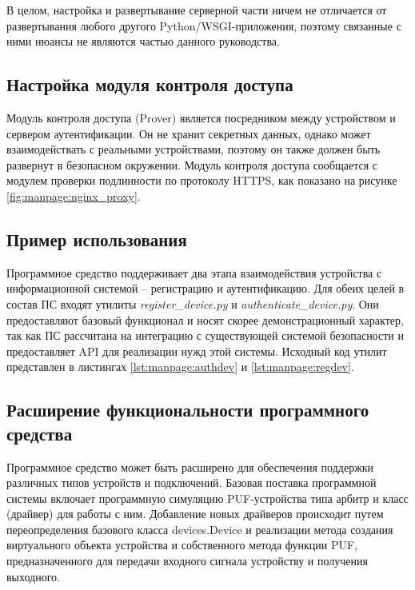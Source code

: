 



В целом, настройка и развертывание серверной части ничем не отличается от развертывания любого другого Python/WSGI-приложения, поэтому связанные с ними нюансы не являются частью данного руководства.

\subsection{Настройка модуля контроля доступа}
\label{sec:manpage:client_setup}
Модуль контроля доступа (Prover) является посредником между устройством и сервером аутентификации. Он не хранит секретных данных, однако может взаимодействать с реальными устройствами, поэтому он также должен быть развернут в безопасном окружении. Модуль контроля доступа сообщается с модулем проверки подлинности по протоколу HTTPS, как показано на рисунке \ref{fig:manpage:nginx_proxy}.


\subsection{Пример использования}
Программное средство поддерживает два этапа взаимодействия устройства с информационной системой -- регистрацию и аутентификацию. Для обеих целей в состав ПС входят утилиты \emph{register\_device.py} и \emph{authenticate\_device.py}. Они предоставляют базовый функционал и носят скорее демонстрационный характер, так как ПС рассчитана на интеграцию с существующей системой безопасности и предоставляет API для реализации нужд этой системы. Исходный код утилит представлен в листингах \ref{lst:manpage:authdev} и \ref{lst:manpage:regdev}.





\subsection{Расширение функциональности программного средства}
Программное средство может быть расширено для обеспечения поддержки различных типов устройств и подключений. Базовая поставка программной системы включает программную симуляцию PUF-устройства типа арбитр и класс (драйвер) для работы с ним. Добавление новых драйверов происходит путем переопределения базового класса devices.Device и реализации метода создания виртуального объекта устройства и собственного метода функции PUF, предназначенного для передачи входного сигнала устройству и получения выходного.


